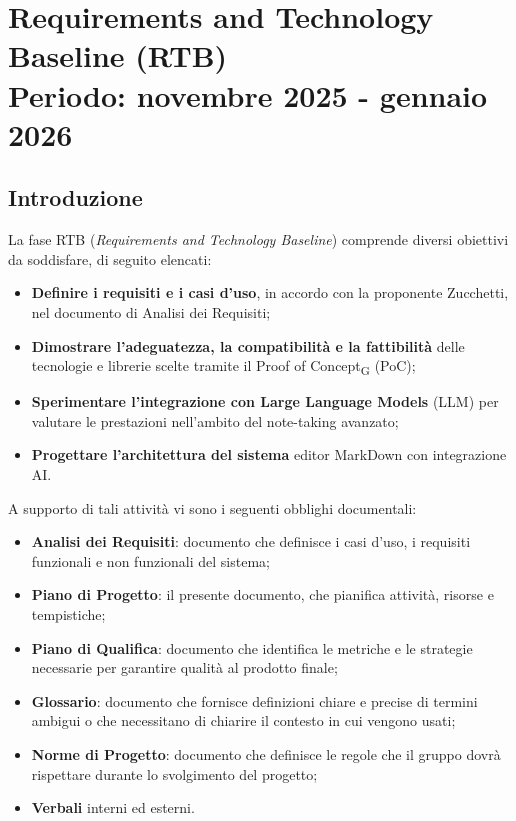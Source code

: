 \documentclass[11pt,a4paper]{article}
\begin{document}
\section{Requirements and Technology Baseline (RTB) \\ \small\textbf{Periodo: novembre 2025 - gennaio 2026}}

\subsection{Introduzione}
La fase RTB (\textit{Requirements and Technology Baseline}) comprende diversi obiettivi da soddisfare, di seguito elencati:

\begin{itemize}
    \item \textbf{Definire i requisiti e i casi d'uso}, in accordo con la proponente Zucchetti, nel documento di Analisi dei Requisiti;
    \item \textbf{Dimostrare l'adeguatezza, la compatibilità e la fattibilità} delle tecnologie e librerie scelte tramite il Proof of Concept\textsubscript{G} (PoC);
    \item \textbf{Sperimentare l'integrazione con Large Language Models} (LLM) per valutare le prestazioni nell'ambito del note-taking avanzato;
    \item \textbf{Progettare l'architettura del sistema} editor MarkDown con integrazione AI.
\end{itemize}

\noindent A supporto di tali attività vi sono i seguenti obblighi documentali:

\begin{itemize}
    \item \textbf{Analisi dei Requisiti}: documento che definisce i casi d'uso, i requisiti funzionali e non funzionali del sistema;
    \item \textbf{Piano di Progetto}: il presente documento, che pianifica attività, risorse e tempistiche;
    \item \textbf{Piano di Qualifica}: documento che identifica le metriche e le strategie necessarie per garantire qualità al prodotto finale;
    \item \textbf{Glossario}: documento che fornisce definizioni chiare e precise di termini ambigui o che necessitano di chiarire il contesto in cui vengono usati;
    \item \textbf{Norme di Progetto}: documento che definisce le regole che il gruppo dovrà rispettare durante lo svolgimento del progetto;
    \item \textbf{Verbali} interni ed esterni.
\end{itemize}
\end{document}
